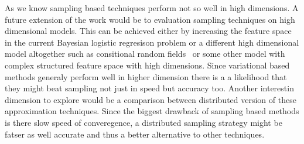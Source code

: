 As we know sampling based techniques perform not so well in high dimensions. A
future extension of the work would be to evaluation sampling techniques on high
dimensional models. This can be achieved either by increasing the feature space
in the current Bayesian logistic regresison problem or a different high
dimensional model altogether such as consitional random fields~\cite{sutton06introduction} 
or some
other model with complex structured feature space with high dimensions. Since
variational based methods generaly perform well in higher dimension there is a
a likelihood that they might beat sampling not just in speed but accuracy too. 
Another interestin dimension to explore would be a comparison between
distributed version of these approximation techniques. Since the biggest
drawback of sampling based methods is there slow speed of converegence, a
distributed sampling strategy might be fatser as well accurate and thus a better
alternative to other techniques. 

% 
% 
